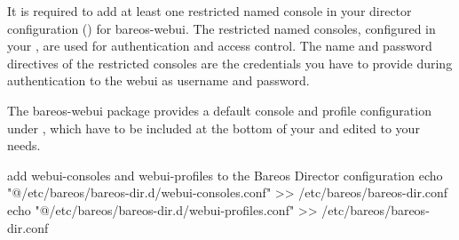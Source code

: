 It is required to add at least one restricted named console in your director configuration () for bareos-webui. The restricted named consoles, configured in your , are used for authentication and access control. The name and password directives of the restricted consoles are the credentials you have to provide during authentication to the webui as username and password.

% 

The bareos-webui package provides a default console and profile configuration under ,
which have to be included at the bottom of your  and edited to your needs.

\begin{commands}{add webui-consoles and webui-profiles to the Bareos Director configuration}
echo "@/etc/bareos/bareos-dir.d/webui-consoles.conf" >> /etc/bareos/bareos-dir.conf
echo "@/etc/bareos/bareos-dir.d/webui-profiles.conf" >> /etc/bareos/bareos-dir.conf
\end{commands}

